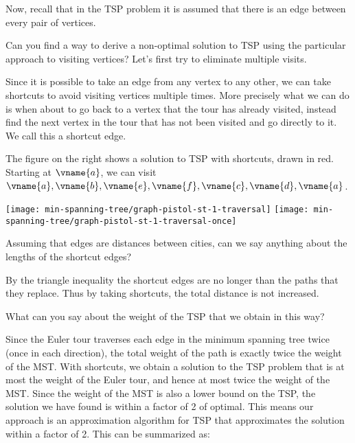 Now, recall that in the TSP problem it is assumed that there
is an edge between every pair of vertices.
\begin{question}
Can you find a way to derive a non-optimal solution to TSP using the
particular approach to visiting vertices?  Let's first try to
eliminate multiple visits.
\end{question}
Since it is possible to take an edge from any vertex to any other, we
can take shortcuts to avoid visiting vertices multiple times.  More
precisely what we can do is when about to go back to a vertex that the
tour has already visited, instead find the next vertex in the tour
that has not been visited and go directly to it.  We call this a
shortcut edge.

\begin{example}
The figure on the right shows a solution to TSP with shortcuts, drawn
in red.  Starting at $\vname{a}$, we can visit $\vname{a}, \vname{b}, \vname{e}, \vname{f}, \vname{c}, \vname{d}, \vname{a}$.

\begin{center}
\texttt{[image: min-spanning-tree/graph-pistol-st-1-traversal]}
%
\hspace{1in}
%
\texttt{[image: min-spanning-tree/graph-pistol-st-1-traversal-once]}
\end{center}

\end{example}

\begin{question}
Assuming that edges are distances between cities, can we say anything
about the lengths of the shortcut edges?
\end{question}

By the triangle inequality the shortcut edges are no longer
than the paths that they replace.  Thus by taking
shortcuts, the total distance is not increased.
\begin{question}
What can you say about the weight of the TSP that we obtain in this way? 
\end{question}
Since the Euler tour traverses each edge in the minimum spanning tree
twice (once in each direction), the total weight of the path is
exactly twice the weight of the MST.  With shortcuts, we obtain a
solution to the TSP problem that is at most the weight of the Euler
tour, and hence at most twice the weight of the MST.  Since the weight
of the MST is also a lower bound on the TSP, the solution we have
found is within a factor of 2 of optimal.  This means our approach is
an approximation algorithm for TSP that approximates the solution
within a factor of 2.   This can be summarized as:


